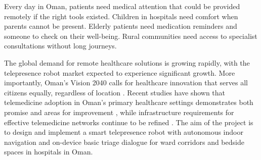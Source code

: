 Every day in Oman, patients need medical attention that could be provided remotely if the right tools existed. Children in hospitals need comfort when parents cannot be present. Elderly patients need medication reminders and someone to check on their well-being. Rural communities need access to specialist consultations without long journeys.

The global demand for remote healthcare solutions is growing rapidly, with the telepresence robot market expected to experience significant growth. More importantly, Oman's Vision 2040 calls for healthcare innovation that serves all citizens equally, regardless of location \cite{alhinai2024}. Recent studies have shown that telemedicine adoption in Oman's primary healthcare settings demonstrates both promise and areas for improvement \cite{alsalmani2023}, while infrastructure requirements for effective telemedicine networks continue to be refined \cite{alshishtawy2013}. The aim of the project is to design and implement a smart telepresence robot with autonomous indoor navigation and on-device basic triage dialogue for ward corridors and bedside spaces in hospitals in Oman.